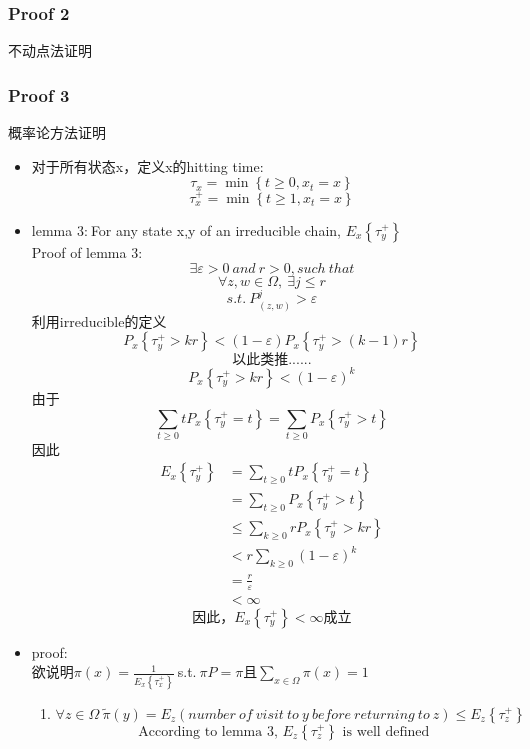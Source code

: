 \documentclass[a4paper, 11pt]{article} %
\begin{document}
\begin{small}
\subsubsection{Proof 2}
不动点法证明

\subsubsection{Proof 3}
概率论方法证明
\begin{itemize}
	\item 对于所有状态x，定义x的hitting time:
	$$
	  \tau_x=\min\left\{t\geq0, x_t=x\right\}
	$$
	$$
	  \tau_x^{+}=\min\left\{t\geq1, x_t=x\right\}
	$$
	\item lemma 3:$\  $For any state x,y of an irreducible chain, $E_x\left\{\tau_y^{+}\right\}$\\
	Proof of lemma 3:
	$$\exists \varepsilon > 0\ and\ r>0,such\ that$$
	$$\forall z,w \in \Omega,\ \exists j\leq r$$
	$$
	 s.t.\ P_{(z,w)}^j>\varepsilon
	$$ 
	利用irreducible的定义\\
	$$
	P_x\left\{\tau_y^{+}>kr\right\}<(1-\varepsilon)P_x\left\{\tau_y^{+}>(k-1)r\right\}
	$$
	$$
	\mbox{以此类推......}
	$$
	$$
	 P_x\left\{\tau_y^{+}>kr\right\}<(1-\varepsilon)^k
	$$
     由于
     $$
     \sum _{t\geq 0}tP_x\left\{\tau_y^{+}=t\right\}=\sum _{t\geq 0}P_x\left\{\tau_y^{+}>t\right\}
     $$
     因此
     \begin{align*}
     E_x\left\{\tau_y^{+}\right\}&=\sum _{t\geq 0}tP_x\left\{\tau_y^{+}=t\right\}\\
     &=\sum _{t\geq 0}P_x\left\{\tau_y^{+}>t\right\}\\
     &\leq \sum _{k\geq 0}rP_x\left\{\tau_y^{+}>kr\right\}\\
     &<r\sum _{k\geq 0}(1-\varepsilon)^k\\
     &=\frac{r}{\varepsilon}\\
     &<\infty
     \end{align*}
     $$
     \mbox{因此，}E_x\left\{\tau_y^{+}\right\}<\infty \mbox{成立}
     $$
	\item proof:\\
	欲说明$\pi(x)=\frac{1}{E_x\left\{\tau_x^{+}\right\}}\ $s.t.$\ \pi P=\pi$且$\sum _{x\in \Omega}\pi(x)=1$
	\begin{enumerate}
		\item
    $$
    \forall z \in \Omega\  \widetilde{\pi}(y)=E_z(number\ of\ visit\ to\ y\ before\ returning\ to\ z)\leq E_z\left\{\tau_z^{+}\right\}
    $$
    $$
    \mbox{According to lemma 3, $E_z\left\{\tau_z^{+}\right\}$ is well defined}
$$
\end{enumerate}
\end{itemize}
\end{small}
\end{document}

